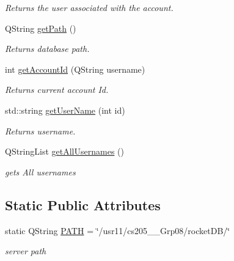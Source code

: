 \begin{DoxyCompactItemize}
\begin{DoxyCompactList}\small\item\em Returns the user associated with the account. \end{DoxyCompactList}\item 
Q\+String \hyperlink{classAccountController_a9ec2a491b5c1b3c166e4f50a75a1e252}{get\+Path} ()
\begin{DoxyCompactList}\small\item\em Returns database path. \end{DoxyCompactList}\item 
int \hyperlink{classAccountController_a31f4f33bedc9367b19f9e88c96f06fa7}{get\+Account\+Id} (Q\+String username)
\begin{DoxyCompactList}\small\item\em Returns current account Id. \end{DoxyCompactList}\item 
std\+::string \hyperlink{classAccountController_a137769fafdaaa27f4a611e249dfb1eaf}{get\+User\+Name} (int id)
\begin{DoxyCompactList}\small\item\em Returns username. \end{DoxyCompactList}\item 
Q\+String\+List \hyperlink{classAccountController_a6124f615929e59cd686eb56e32b4e83f}{get\+All\+Usernames} ()
\begin{DoxyCompactList}\small\item\em gets All usernames \end{DoxyCompactList}\end{DoxyCompactItemize}
\subsection*{Static Public Attributes}
\begin{DoxyCompactItemize}
\item 
static Q\+String \hyperlink{classAccountController_ae5ae819d313ad3670b2c278bcfacd608}{P\+A\+TH} = \char`\"{}/usr11/cs205\+\_\+\_\+\+Grp08/rocket\+DB/\char`\"{}\hypertarget{classAccountController_ae5ae819d313ad3670b2c278bcfacd608}{}\label{classAccountController_ae5ae819d313ad3670b2c278bcfacd608}

\begin{DoxyCompactList}\small\item\em server path \end{DoxyCompactList}\end{DoxyCompactItemize}


